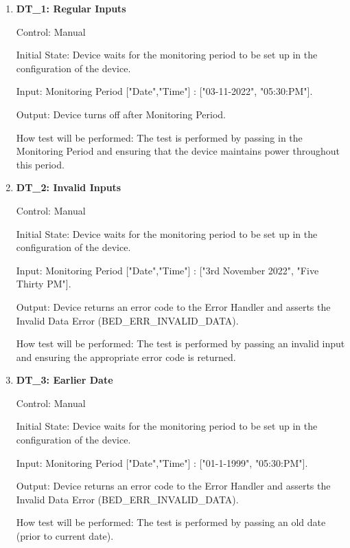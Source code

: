 \documentclass[12pt, titlepage]{article}
\begin{document}
\begin{enumerate}

	\item{\textbf{DT\_1: Regular Inputs}\\}\label{DT1}
		
		Control: Manual 
							
		Initial State: Device waits for the monitoring period to be set up in the configuration of the device.
							
		Input: Monitoring Period ["Date","Time"]  : ["03-11-2022", "05:30:PM"].
		
		Output: Device turns off after Monitoring Period.
							
		How test will be performed: The test is performed by passing in the Monitoring Period and ensuring that the device maintains power throughout this period.
					
	\item{\textbf{DT\_2: Invalid Inputs}\\}\label{DT2}
	
		Control: Manual 
							
		Initial State: Device waits for the monitoring period to be set up in the configuration of the device.
							
		Input: Monitoring Period ["Date","Time"] : ["3rd November 2022", "Five Thirty PM"].
							
		Output: Device returns an error code to the Error Handler and asserts the Invalid Data Error (BED\_ERR\_INVALID\_DATA).
		
		How test will be performed: The test is performed by passing an invalid input and ensuring the appropriate error code is returned.

	\item{\textbf{DT\_3: Earlier Date}\\}\label{DT3}
		
		Control: Manual 
							
		Initial State: Device waits for the monitoring period to be set up in the configuration of the device.
							
		Input: Monitoring Period ["Date","Time"] : ["01-1-1999", "05:30:PM"].
							
		Output: Device returns an error code to the Error Handler and asserts the Invalid Data Error (BED\_ERR\_INVALID\_DATA).
		
		How test will be performed: The test is performed by passing an old date (prior to current date).


\end{enumerate}
\end{document}
